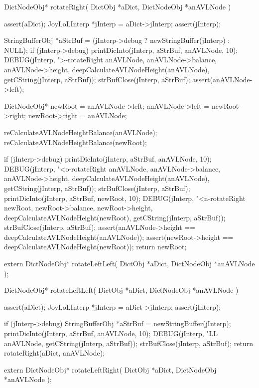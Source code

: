 \startCCode
DictNodeObj* rotateRight(
  DictObj     *aDict,
  DictNodeObj *anAVLNode
) {
  assert(aDict);
  JoyLoLInterp *jInterp = aDict->jInterp;
  assert(jInterp);
  
  StringBufferObj *aStrBuf =
    (jInterp->debug ? newStringBuffer(jInterp) : NULL);
  if (jInterp->debug) {
    printDicInto(jInterp, aStrBuf, anAVLNode, 10);
    DEBUG(jInterp, ">-rotateRight %
          anAVLNode, anAVLNode->balance, anAVLNode->height,
          deepCalculateAVLNodeHeight(anAVLNode),
          getCString(jInterp, aStrBuf));
    strBufClose(jInterp, aStrBuf);
  }
  assert(anAVLNode->left);

  DictNodeObj* newRoot = anAVLNode->left;
  anAVLNode->left = newRoot->right;
  newRoot->right  = anAVLNode;

  reCalculateAVLNodeHeightBalance(anAVLNode);
  reCalculateAVLNodeHeightBalance(newRoot);

  if (jInterp->debug) {
    printDicInto(jInterp, aStrBuf, anAVLNode, 10);
    DEBUG(jInterp, "<o-rotateRight %
          anAVLNode, anAVLNode->balance, anAVLNode->height,
          deepCalculateAVLNodeHeight(anAVLNode),
          getCString(jInterp, aStrBuf));
    strBufClose(jInterp, aStrBuf);
    printDicInto(jInterp, aStrBuf, newRoot, 10);
    DEBUG(jInterp, "<n-rotateRight %
          newRoot, newRoot->balance, newRoot->height,
          deepCalculateAVLNodeHeight(newRoot),
          getCString(jInterp, aStrBuf));
    strBufClose(jInterp, aStrBuf);
  }
  assert(anAVLNode->height == deepCalculateAVLNodeHeight(anAVLNode));
  assert(newRoot->height == deepCalculateAVLNodeHeight(newRoot));
  return newRoot;
}
\stopCCode

\startCHeader
extern DictNodeObj* rotateLeftLeft(
  DictObj     *aDict,
  DictNodeObj *anAVLNode
);
\stopCHeader

\startCCode
DictNodeObj* rotateLeftLeft(
  DictObj     *aDict,
  DictNodeObj *anAVLNode
) {
  assert(aDict);
  JoyLoLInterp *jInterp = aDict->jInterp;
  assert(jInterp);
  
  if (jInterp->debug) {
    StringBufferObj *aStrBuf = newStringBuffer(jInterp);
    printDicInto(jInterp, aStrBuf, anAVLNode, 10);
    DEBUG(jInterp, "LL %
      anAVLNode, getCString(jInterp, aStrBuf));
    strBufClose(jInterp, aStrBuf);
  }
  return rotateRight(aDict, anAVLNode);
}
\stopCCode

\startCHeader
extern DictNodeObj* rotateLeftRight(
  DictObj     *aDict,
  DictNodeObj *anAVLNode
);
\stopCHeader

